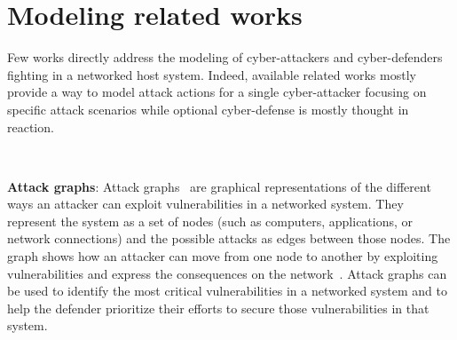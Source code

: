 
\section{Modeling related works}

\noindent

Few works directly address the modeling of cyber-attackers and cyber-defenders fighting in a networked host system. Indeed, available related works mostly provide a way to model attack actions for a single cyber-attacker focusing on specific attack scenarios while optional cyber-defense is mostly thought in reaction.


\

\noindent
\textbf{Attack graphs}: \quad Attack graphs~\cite{CPhilips1998} are graphical representations of the different ways an attacker can exploit vulnerabilities in a networked system. They represent the system as a set of nodes (such as computers, applications, or network connections) and the possible attacks as edges between those nodes. The graph shows how an attacker can move from one node to another by exploiting vulnerabilities and express the consequences on the network~\cite{CPhilips1998}.
Attack graphs can be used to identify the most critical vulnerabilities in a networked system and to help the defender prioritize their efforts to secure those vulnerabilities in that system.

